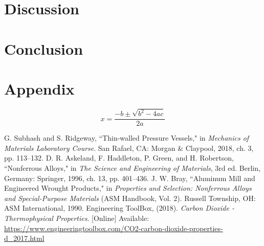 \documentclass[10pt,journal,letterpaper]{IEEEtran}
\begin{document}
\section{Discussion}

\lipsum[11-20]

\section{Conclusion}

\lipsum[21]

\section*{Appendix}

\lipsum[22-24]
\begin{equation}
x=\frac{-b\pm\sqrt{b^2-4ac}}{2a}
\end{equation}
\lipsum[25]


\begin{thebibliography}{00}
 G. Subhash and S. Ridgeway, ``Thin-walled Pressure Vessels," in \textit{Mechanics of Materials Laboratory Course}. San Rafael, CA: Morgan \& Claypool, 2018, ch. 3, pp. 113--132.
 D. R. Askeland, F. Haddleton, P. Green, and H. Robertson, ``Nonferrous Alloys," in \textit{The Science and Engineering of Materials}, 3rd ed. Berlin, Germany: Springer, 1996, ch. 13, pp. 401--436.
 J. W. Bray, ``Aluminum Mill and Engineered Wrought Products," in \textit{Properties and Selection: Nonferrous Alloys and Special-Purpose Materials} (ASM Handbook, Vol. 2). Russell Township, OH: ASM International, 1990.
 Engineering ToolBox, (2018). \textit{Carbon Dioxide - Thermophysical Properties}. [Online] Available: \url{https://www.engineeringtoolbox.com/CO2-carbon-dioxide-properties-d_2017.html}
\end{thebibliography}
\end{document}
